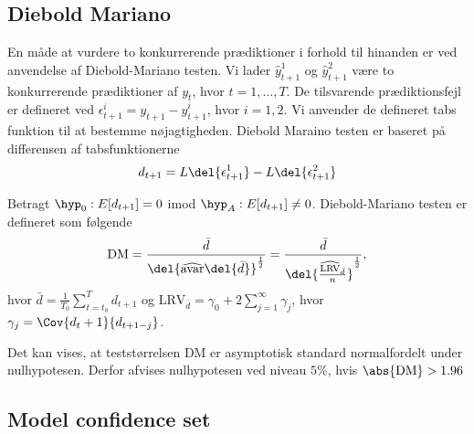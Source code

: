 \subsection{Diebold Mariano}
En måde at vurdere to konkurrerende prædiktioner i forhold til hinanden er ved anvendelse af Diebold-Mariano testen. 
Vi lader $\widehat{y}_{t+1}^1$ og  $\widehat{y}_{t +1}^2$ være to konkurrerende prædiktioner af $y_t$, hvor $t = 1, \dots, T$. 
De tilsvarende prædiktionsfejl er defineret ved $\epsilon^i_{t +1} = y_{t +1} - \widehat{y}^i_{t +1} $,  hvor $i = 1, 2$. 
Vi anvender de defineret tabs funktion til at bestemme nøjagtigheden. 
%
Diebold Maraino testen er baseret på differensen af tabsfunktionerne
%
\begin{align*}
d_{t +1} = L\del{\epsilon^1_{t +1}} - L\del{\epsilon^2_{t +1}}
\end{align*}
%
%
\begin{defn}
Betragt $\hyp_0 : E[d_{t +1}] = 0$ imod  $\hyp_A : E[d_{t +1} ] \neq 0$. 
Diebold-Mariano testen er defineret som følgende 
\begin{align*}
\text{DM} = \frac{\bar{d}}{\del{\widehat{\text{avar}}\del{\bar{d}}}^{\frac{1}{2}}} =  \frac{\bar{d}}{\del{\frac{\widehat{\text{LRV}}_{\bar{d}}}{n}}^{\frac{1}{2}}},
\end{align*}
hvor $\bar{d} = \frac{1}{T_0} \sum^{T}_{t = t_0} d_{t +1} $ og $\text{LRV}_{\bar{d}} = \gamma_0 + 2\sum_{j = 1}^{\infty} \gamma_j$, hvor $\gamma_j = \Cov{d_t +1 }{d_{t +1 -j}}$. 
\end{defn}
%
Det kan vises, at teststørrelsen DM er asymptotisk standard normalfordelt under nulhypotesen. Derfor afvises nulhypotesen ved niveau $5 \%$, hvis $\abs{\text{DM}} > 1.96$

\subsection{Model confidence set}